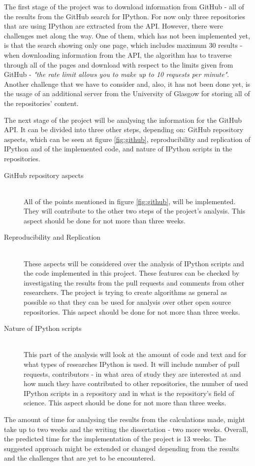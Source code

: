 The first stage of the project was to download information from GitHub - all of the results from the GitHub search for IPython.\cite{gitHubAPI} For now only three repositories that are using IPython are extracted from the API. However, there were challenges met along the way. One of them, which has not been implemented yet, is that the search showing only one page, which includes maximum 30 results - when downloading information from the API, the algorithm has to traverse through all of the pages and download with respect to the limits given from GitHub - \textit{"the rate limit allows you to make up to 10 requests per minute"}\cite{traverseGitHub}. Another challenge that we have to consider and, also, it has not been done yet, is the usage of an additional server from the University of Glasgow for storing all of the repositories' content. 

The next stage of the project will be analysing the information for the GitHub API. It can be divided into three other steps, depending on: GitHub repository aspects, which can be seen at figure \ref{fig:github}, reproducibility and replication of IPython and of the implemented code, and nature of IPython scripts in the repositories. 

\begin{description}
\item[GitHub repository aspects] \hfill \\ All of the points mentioned in figure \ref{fig:github}, will be implemented. They will contribute to the other two steps of the project's analysis. This aspect should be done for not more than three weeks. 

\item[Reproducibility and Replication] \hfill \\ These aspects will be considered over the analysis of IPython scripts and the code implemented in this project. These features can be checked by investigating the results from the pull requests and comments from other researchers. The project is trying to create algorithms as general as possible so that they can be used for analysis over other open source repositories. This aspect should be done for not more than three weeks. 

\item[Nature of IPython scripts] \hfill \\ This part of the analysis will look at the amount of code and text and for what types of researches IPython is used. It will include number of pull requests, contributors - in what area of study they are interested at and how much they have contributed to other repositories, the number of used IPython scripts in a repository and in what is the repository's field of science. This aspect should be done for not more than three weeks. 
\end{description}

The amount of time for analysing the results from the calculations made, might take up to two weeks and the writing the dissertation - two more weeks. Overall, the predicted time for the implementation of the project is 13 weeks. The suggested approach might be extended or changed depending from the results and the challenges that are yet to be encountered.